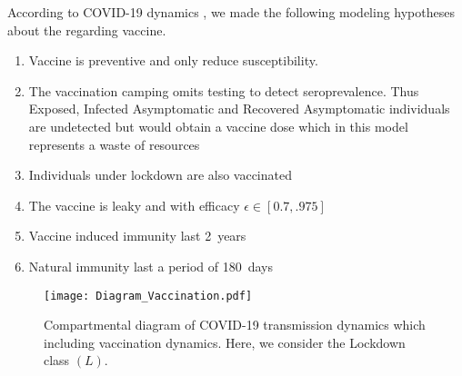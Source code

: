 %
\begin{assumptions}
     According to COVID-19 dynamics , we
     made the following modeling hypotheses about the regarding vaccine.
     \begin{enumerate}[label={\textbf{(VH-\arabic*)}}]
        \item
            Vaccine is preventive and only reduce susceptibility.
            
        \item
            The vaccination camping omits testing to detect seroprevalence.
            Thus Exposed, Infected Asymptomatic and Recovered Asymptomatic
            individuals are undetected but would obtain a vaccine dose
            \textemdash which in this model represents a waste of resources
        \item
            Individuals under lockdown are also vaccinated
        \item
            The vaccine is leaky and with efficacy $\epsilon \in[0.7, .975]$
        \item   
            Vaccine induced immunity last \SI{2}{years}
        \item   
            Natural immunity last a period of \SI{180}{days} 
     \end{enumerate}
\end{assumptions}
\begin{figure*}[tbh]
    \centering
      \texttt{[image: Diagram\_Vaccination.pdf]}
    \caption{Compartmental diagram of COVID-19 transmission dynamics which 
        including vaccination dynamics. Here, we consider the Lockdown class $(L)$.}
    \label{fig:diagram_vaccination}
\end{figure*}
%

